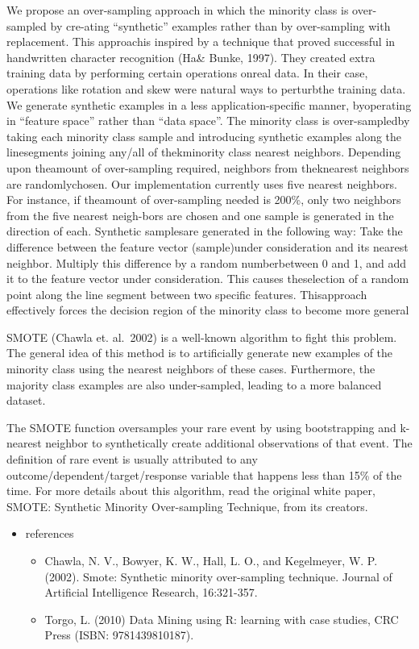 \documentclass[
]{report}
\providecommand{\tightlist}{%
  \setlength{\itemsep}{0pt}\setlength{\parskip}{0pt}}
\begin{document}
We propose an over-sampling approach in which the minority class is over-sampled by cre-ating ``synthetic'' examples rather than by over-sampling with replacement. This approachis inspired by a technique that proved successful in handwritten character recognition (Ha\& Bunke, 1997). They created extra training data by performing certain operations onreal data. In their case, operations like rotation and skew were natural ways to perturbthe training data. We generate synthetic examples in a less application-specific manner, byoperating in ``feature space'' rather than ``data space''. The minority class is over-sampledby taking each minority class sample and introducing synthetic examples along the linesegments joining any/all of thekminority class nearest neighbors. Depending upon theamount of over-sampling required, neighbors from theknearest neighbors are randomlychosen. Our implementation currently uses five nearest neighbors. For instance, if theamount of over-sampling needed is 200\%, only two neighbors from the five nearest neigh-bors are chosen and one sample is generated in the direction of each. Synthetic samplesare generated in the following way: Take the difference between the feature vector (sample)under consideration and its nearest neighbor. Multiply this difference by a random numberbetween 0 and 1, and add it to the feature vector under consideration. This causes theselection of a random point along the line segment between two specific features. Thisapproach effectively forces the decision region of the minority class to become more general

SMOTE (Chawla et. al.~2002) is a well-known algorithm to fight this problem. The general idea of this method is to artificially generate new examples of the minority class using the nearest neighbors of these cases. Furthermore, the majority class examples are also under-sampled, leading to a more balanced dataset.

The SMOTE function oversamples your rare event by using bootstrapping and k-nearest neighbor to synthetically create additional observations of that event. The definition of rare event is usually attributed to any outcome/dependent/target/response variable that happens less than 15\% of the time. For more details about this algorithm, read the original white paper, SMOTE: Synthetic Minority Over-sampling Technique, from its creators.

\begin{itemize}
\tightlist
\item
  references

  \begin{itemize}
  \tightlist
  \item
    Chawla, N. V., Bowyer, K. W., Hall, L. O., and Kegelmeyer, W. P. (2002). Smote: Synthetic minority over-sampling technique. Journal of Artificial Intelligence Research, 16:321-357.
  \item
    Torgo, L. (2010) Data Mining using R: learning with case studies, CRC Press (ISBN: 9781439810187).
  \end{itemize}
\end{itemize}
\end{document}
